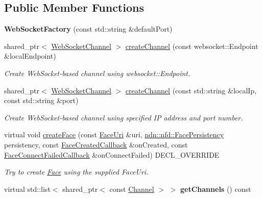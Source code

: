 \subsection*{Public Member Functions}
\begin{DoxyCompactItemize}
\item 
{\bfseries Web\+Socket\+Factory} (const std\+::string \&default\+Port)\hypertarget{classnfd_1_1WebSocketFactory_a9b65cbe4037fe6cedf2d8642bebfe277}{}\label{classnfd_1_1WebSocketFactory_a9b65cbe4037fe6cedf2d8642bebfe277}

\item 
shared\+\_\+ptr$<$ \hyperlink{classnfd_1_1WebSocketChannel}{Web\+Socket\+Channel} $>$ \hyperlink{classnfd_1_1WebSocketFactory_a2fef75e37bab4022e8820e3e7c2517c2}{create\+Channel} (const websocket\+::\+Endpoint \&local\+Endpoint)
\begin{DoxyCompactList}\small\item\em Create Web\+Socket-\/based channel using websocket\+::\+Endpoint. \end{DoxyCompactList}\item 
shared\+\_\+ptr$<$ \hyperlink{classnfd_1_1WebSocketChannel}{Web\+Socket\+Channel} $>$ \hyperlink{classnfd_1_1WebSocketFactory_ae972a2a3b405aac2d56d1f3cb3df80ec}{create\+Channel} (const std\+::string \&local\+Ip, const std\+::string \&port)
\begin{DoxyCompactList}\small\item\em Create Web\+Socket-\/based channel using specified IP address and port number. \end{DoxyCompactList}\item 
virtual void \hyperlink{classnfd_1_1WebSocketFactory_a897429d95c0b5cde2744bc8e9ae5749b}{create\+Face} (const \hyperlink{classndn_1_1util_1_1FaceUri}{Face\+Uri} \&uri, \hyperlink{group__management_ga05df4b7c484a0fae25d3e65962511bac}{ndn\+::nfd\+::\+Face\+Persistency} persistency, const \hyperlink{namespacenfd_a6d4b91580c829552a452c53458381b0f}{Face\+Created\+Callback} \&on\+Created, const \hyperlink{namespacenfd_ae87d4f07de26f4939691439b51f2dd83}{Face\+Connect\+Failed\+Callback} \&on\+Connect\+Failed) D\+E\+C\+L\+\_\+\+O\+V\+E\+R\+R\+I\+DE
\begin{DoxyCompactList}\small\item\em Try to create \hyperlink{classnfd_1_1Face}{Face} using the supplied Face\+Uri. \end{DoxyCompactList}\item 
virtual std\+::list$<$ shared\+\_\+ptr$<$ const \hyperlink{classnfd_1_1Channel}{Channel} $>$ $>$ {\bfseries get\+Channels} () const\hypertarget{classnfd_1_1WebSocketFactory_a36b69c79e8dd947619c1834a8501d605}{}\label{classnfd_1_1WebSocketFactory_a36b69c79e8dd947619c1834a8501d605}

\end{DoxyCompactItemize}


